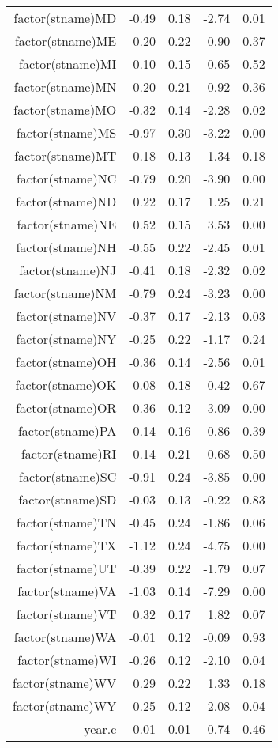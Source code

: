 \begin{table}[ht]
\begin{tabular}{rrrrr}
  factor(stname)MD & -0.49 & 0.18 & -2.74 & 0.01 \\ 
  factor(stname)ME & 0.20 & 0.22 & 0.90 & 0.37 \\ 
  factor(stname)MI & -0.10 & 0.15 & -0.65 & 0.52 \\ 
  factor(stname)MN & 0.20 & 0.21 & 0.92 & 0.36 \\ 
  factor(stname)MO & -0.32 & 0.14 & -2.28 & 0.02 \\ 
  factor(stname)MS & -0.97 & 0.30 & -3.22 & 0.00 \\ 
  factor(stname)MT & 0.18 & 0.13 & 1.34 & 0.18 \\ 
  factor(stname)NC & -0.79 & 0.20 & -3.90 & 0.00 \\ 
  factor(stname)ND & 0.22 & 0.17 & 1.25 & 0.21 \\ 
  factor(stname)NE & 0.52 & 0.15 & 3.53 & 0.00 \\ 
  factor(stname)NH & -0.55 & 0.22 & -2.45 & 0.01 \\ 
  factor(stname)NJ & -0.41 & 0.18 & -2.32 & 0.02 \\ 
  factor(stname)NM & -0.79 & 0.24 & -3.23 & 0.00 \\ 
  factor(stname)NV & -0.37 & 0.17 & -2.13 & 0.03 \\ 
  factor(stname)NY & -0.25 & 0.22 & -1.17 & 0.24 \\ 
  factor(stname)OH & -0.36 & 0.14 & -2.56 & 0.01 \\ 
  factor(stname)OK & -0.08 & 0.18 & -0.42 & 0.67 \\ 
  factor(stname)OR & 0.36 & 0.12 & 3.09 & 0.00 \\ 
  factor(stname)PA & -0.14 & 0.16 & -0.86 & 0.39 \\ 
  factor(stname)RI & 0.14 & 0.21 & 0.68 & 0.50 \\ 
  factor(stname)SC & -0.91 & 0.24 & -3.85 & 0.00 \\ 
  factor(stname)SD & -0.03 & 0.13 & -0.22 & 0.83 \\ 
  factor(stname)TN & -0.45 & 0.24 & -1.86 & 0.06 \\ 
  factor(stname)TX & -1.12 & 0.24 & -4.75 & 0.00 \\ 
  factor(stname)UT & -0.39 & 0.22 & -1.79 & 0.07 \\ 
  factor(stname)VA & -1.03 & 0.14 & -7.29 & 0.00 \\ 
  factor(stname)VT & 0.32 & 0.17 & 1.82 & 0.07 \\ 
  factor(stname)WA & -0.01 & 0.12 & -0.09 & 0.93 \\ 
  factor(stname)WI & -0.26 & 0.12 & -2.10 & 0.04 \\ 
  factor(stname)WV & 0.29 & 0.22 & 1.33 & 0.18 \\ 
  factor(stname)WY & 0.25 & 0.12 & 2.08 & 0.04 \\ 
  year.c & -0.01 & 0.01 & -0.74 & 0.46 \\ 
   \hline
\end{tabular}
\end{table}

